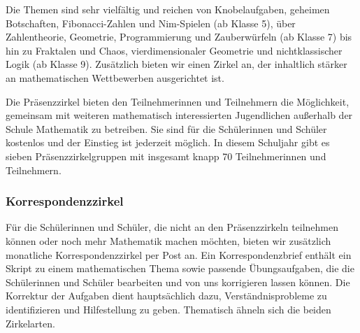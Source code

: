 \documentclass[12pt]{zettel}
\begin{document}
% 



Die Themen sind sehr vielfältig und reichen von
Knobelaufgaben, geheimen Botschaften, Fibonacci-Zahlen und Nim-Spielen (ab Klasse 5),
über Zahlentheorie, Geometrie, Programmierung und Zauberwürfeln (ab Klasse 7) bis hin zu
Fraktalen und Chaos, vierdimensionaler Geometrie und nichtklassischer Logik
(ab Klasse 9). Zusätzlich bieten wir einen Zirkel an, der inhaltlich stärker an
mathematischen Wettbewerben ausgerichtet ist.

Die Präsenzzirkel bieten den Teilnehmerinnen und Teilnehmern die Möglichkeit,
gemeinsam mit weiteren mathematisch interessierten Jugendlichen außerhalb der
Schule Mathematik zu betreiben. Sie sind für die Schülerinnen und Schüler kostenlos und der Einstieg ist jederzeit möglich. In diesem Schuljahr gibt es sieben Präsenzzirkelgruppen mit insgesamt knapp 70 Teilnehmerinnen und Teilnehmern.

\subsubsection*{Korrespondenzzirkel}

Für die Schülerinnen und Schüler, die nicht an den Präsenzzirkeln teilnehmen können oder noch mehr Mathematik machen möchten, bieten wir zusätzlich monatliche Korrespondenzzirkel per Post an. Ein Korrespondenzbrief enthält ein Skript zu einem mathematischen Thema sowie passende Übungsaufgaben, die die Schülerinnen und Schüler bearbeiten und von uns korrigieren lassen können. Die Korrektur der Aufgaben dient hauptsächlich dazu, Verständnisprobleme zu identifizieren und Hilfestellung zu geben. Thematisch ähneln sich die beiden Zirkelarten. 
% 
\end{document}
